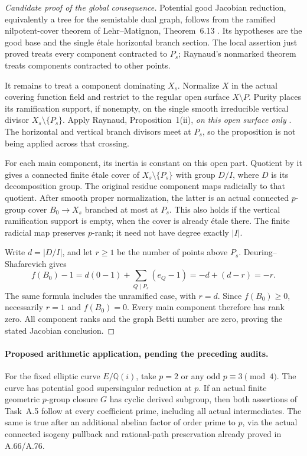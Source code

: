 \begin{proof}[Candidate proof of the global consequence]
Potential good Jacobian reduction, equivalently a tree
for the semistable dual graph, follows from the ramified
nilpotent-cover theorem of Lehr--Matignon,
Theorem~6.13 \cite{fghLehrMatignon2005}. Its hypotheses
are the good base and the single \'etale horizontal branch
section. The local assertion just proved treats every
component contracted to \(P_s\); Raynaud's nonmarked
theorem treats components contracted to other points.

It remains to treat a component dominating \(X_s\).
Normalize \(X\) in the actual covering function field
and restrict to the regular open surface \(X\setminus P\).
Purity places its ramification support, if nonempty, on
the single smooth irreducible vertical divisor
\(X_s\setminus\{P_s\}\). Apply Raynaud,
Proposition~1(ii), \emph{on this open surface only}
\cite{fghRaynaud1990Pgroups}. The horizontal and vertical branch
divisors meet at \(P_s\), so the proposition is not
being applied across that crossing.

For each main component, its inertia is constant on this
open part. Quotient by it gives a connected finite \'etale
cover of \(X_s\setminus\{P_s\}\) with group \(D/I\),
where \(D\) is its decomposition group. The original
residue component maps radicially to that quotient.
After smooth proper normalization, the latter is an actual
connected \(p\)-group cover \(B_0\to X_s\) branched
at most at \(P_s\). This also holds if the vertical
ramification support is empty, when the cover is already
\'{e}tale there. The finite radicial map preserves
\(p\)-rank; it need not have degree exactly \(|I|\).

Write \(d=|D/I|\), and let \(r\ge1\) be the number
of points above \(P_s\). Deuring--Shafarevich gives
\[
 f(B_0)-1=d(0-1)+\sum_{Q\mid P_s}(e_Q-1)
              =-d+(d-r)=-r.                            \tag{SB.4}
\]
The same formula includes the unramified case, with
\(r=d\). Since \(f(B_0)\ge0\), necessarily \(r=1\)
and \(f(B_0)=0\). Every main component therefore has
rank zero. All component ranks and the graph Betti number
are zero, proving the stated Jacobian conclusion.
\end{proof}

\paragraph{Proposed arithmetic application, pending the preceding audits.}
For the fixed elliptic curve \(E/\mathbb Q(i)\), take
\(p=2\) or any odd \(p\equiv3\pmod4\). The curve
has potential good supersingular reduction at \(p\).
If an actual finite geometric \(p\)-group closure \(G\)
has cyclic derived subgroup, then both assertions of
Task~A.5 follow at every coefficient prime, including all
actual intermediates. The same is true after an additional
abelian factor of order prime to \(p\), via the actual
connected isogeny pullback and rational-path preservation
already proved in A.66/A.76.

